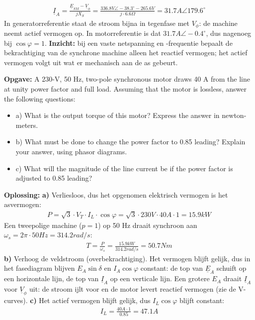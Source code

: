 \begin{oefenblok}
\begin{align*}
    \underline{I}_A = \frac{\underline{E}_{SM} - \underline{V}_\phi}{j X_S} = \frac{336.8 V \angle -38.3^\circ - 265.6 V}{j \cdot 6.6 \Omega} = 31.7 A \angle 179.6^\circ
\end{align*}
In generatorreferentie staat de stroom bijna in tegenfase met $V_\phi$: de machine neemt
actief vermogen op.
In motorreferentie is dat $31.7 A \angle -0.4^\circ$, dus nagenoeg bij $\cos\varphi = 1$.
\newline
\textbf{Inzicht:} bij een vaste netspanning en -frequentie bepaalt de bekrachtiging van de
synchrone machine alleen het reactief vermogen; het actief vermogen volgt uit wat er
mechanisch aan de as gebeurt.
\end{oefenblok}

\begin{oefenblok}
\textbf{Opgave:}
\newline
A 230-V, 50 Hz, two-pole synchronous motor draws 40 A from the line at unity power factor
and full load.
Assuming that the motor is lossless, answer the following questions:
\begin{itemize}
 \item a) What is the output torque of this motor? Express the answer in newton-meters.
 \item b) What must be done to change the power factor to 0.85 leading?
 Explain your answer, using phasor diagrams.
 \item c) What will the magnitude of the line current be if the power factor is adjusted
 to 0.85 leading?
\end{itemize}
\textbf{Oplossing:}
\newline
\textbf{a)}
Verliesloos, dus het opgenomen elektrisch vermogen is het asvermogen:
\begin{align*}
    P = \sqrt{3} \cdot V_T \cdot I_L \cdot \cos\varphi = \sqrt{3} \cdot 230 V \cdot 40 A \cdot 1 = 15.9 kW
\end{align*}
Een tweepolige machine ($p = 1$) op 50 Hz draait synchroon aan
$\omega_s = 2 \pi \cdot 50 Hz = 314.2 rad/s$:
\begin{align*}
    T = \frac{P}{\omega_s} = \frac{15.9 kW}{314.2 rad/s} = 50.7 Nm
\end{align*}
\textbf{b)}
Verhoog de veldstroom (overbekrachtiging).
Het vermogen blijft gelijk, dus in het fasediagram blijven $E_A \sin\delta$ en
$I_A \cos\varphi$ constant: de top van $\underline{E}_A$ schuift op een horizontale lijn,
de top van $\underline{I}_A$ op een verticale lijn.
Een grotere $E_A$ draait $\underline{I}_A$ voor $\underline{V}_\phi$ uit: de stroom ijlt voor
en de motor levert reactief vermogen (zie de V-curves).
\newline
\textbf{c)}
Het actief vermogen blijft gelijk, dus $I_L \cos\varphi$ blijft constant:
\begin{align*}
    I_L = \frac{40 A \cdot 1}{0.85} = 47.1 A
\end{align*}
\end{oefenblok}

